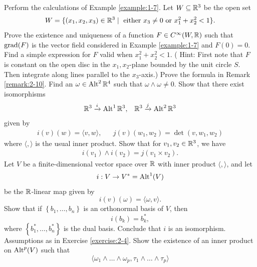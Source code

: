 \begin{enumerate}[label=\theexercise.\arabic*.,ref=\theexercise.\arabic*,leftmargin=2.7em]
  \NewItem Perform the calculations of Example \ref{example:1-7}.
  \NewItem Let $W\subseteq{\ensuremath{\mathbb{R}}}^3$ be the open set
    \begin{align*}
      W = \{(x_1, x_2, x_3)\in{\ensuremath{\mathbb{R}}}^3\mid \text{ either } x_3\neq 0 \text{ or } x_1^2 + x_2^2<1\}.
    \end{align*}
    Prove the existence and uniqueness of a function $F\in C^\infty(W, {\mathbb{R}})$ such that
    $\operatorname{grad}(F)$ is the vector field considered in Example \ref{example:1-7} and $F(0)= 0$.
    Find a simple expression for $F$ valid when $x_1^2 + x_2^2 < 1$. ( Hint: First note that $F$ is
    constant on the open disc in the $x_1, x_2$-plane bounded by the unit circle $S$. Then integrate
    along lines parallel to the $x_3$-axis.) 
  \newchap[2]
  \NewItem Prove the formula in Remark \ref{remark:2-10}.
  \NewItem Find an $\omega\in\operatorname{Alt}^2{\mathbb{R}}^4$ such that $\omega\wedge\omega\neq 0$.
  \NewItem Show that there exist isomorphisms
    \begin{align*}
      \RR^3 \xra[i] \alt^1\RR^3, &  & \RR^3 \xra[j]\alt^2\RR^3
    \end{align*}
    given by
    \begin{align*}
      i(v)(w) = \langle v, w \rangle, &  & j(v)(w_1, w_2) = \det(v, w_1, w_2)
    \end{align*}
    where $\langle, \rangle$ is the usual inner product. Show that for $v_1, v_2\in{\ensuremath{\mathbb{R}}}^3$, we have
    \begin{align*}
      i(v_1)\wedge i(v_2) = j(v_1\times v_2).
    \end{align*}
  \NewItem Let $V$ be a finite-dimensional vector space over $\mathbb{R}$ with inner product $\langle, \rangle$, and let
    \[
      i : V \rightarrow  {V}^* = {\operatorname{Alt}}^{1}( V)
    \]
    be the $\mathbb{R}$-linear map given by
    \[
      i( v) ( \omega )  = \langle \omega,v\rangle.
    \]
    Show that if $\left\{  {b_1,\ldots,{b}_{n}}\right\}$ is an orthonormal basis of $V$, then
    \[
      i( {b}_{k})  = {b}_{k}^*,
    \]
    where $\left\{  {b_1^*,\ldots,{b}_{n}^*}\right\}$ is the dual basis. Conclude
    that $i$ is an isomorphism.
  \NewItem Assumptions as in Exercise \ref{exercise:2-4}. Show the existence of an inner product on ${\operatorname{Alt}}^{p}( V)$
    such that
    \[
      \langle  {{\omega }_{1} \land  \ldots  \land  {\omega }_{p}, {\tau }_{1} \land  \ldots  \land  {\tau }_{p}}\rangle
\]
\end{enumerate}
